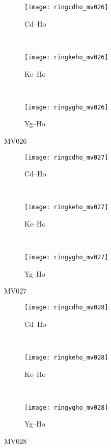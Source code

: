	\begin{figure}[h]
		\centering
		\begin{subfigure}[t]{0.9\textwidth}
			\centering
			\texttt{[image: ringcdho\_mv026]}
			\caption[Cd-Ho MV026]{Cd--Ho}
		\end{subfigure}
		~
		\begin{subfigure}[t]{0.9\textwidth}
			\centering
			\texttt{[image: ringkeho\_mv026]}
			\caption[Ke-Ho MV026]{Ke--Ho}
		\end{subfigure}
		~			
		\begin{subfigure}[t]{0.9\textwidth}
			\centering
			\texttt{[image: ringygho\_mv026]}
			\caption[Yg-Ho MV026]{Yg--Ho}
		\end{subfigure}
		\caption[]{MV026}
	\end{figure}

	\begin{figure}[h]
		\centering
		\begin{subfigure}[t]{0.9\textwidth}
			\centering
			\texttt{[image: ringcdho\_mv027]}
			\caption[Cd-Ho MV027]{Cd--Ho}
		\end{subfigure}
		~
		\begin{subfigure}[t]{0.9\textwidth}
			\centering
			\texttt{[image: ringkeho\_mv027]}
			\caption[Ke-Ho MV027]{Ke--Ho}
		\end{subfigure}
		~			
		\begin{subfigure}[t]{0.9\textwidth}
			\centering
			\texttt{[image: ringygho\_mv027]}
			\caption[Yg-Ho MV027]{Yg--Ho}
		\end{subfigure}
		\caption[]{MV027}
	\end{figure}

	\begin{figure}[h]
		\centering
		\begin{subfigure}[t]{0.9\textwidth}
			\centering
			\texttt{[image: ringcdho\_mv028]}
			\caption[Cd-Ho MV028]{Cd--Ho}
		\end{subfigure}
		~
		\begin{subfigure}[t]{0.9\textwidth}
			\centering
			\texttt{[image: ringkeho\_mv028]}
			\caption[Ke-Ho MV028]{Ke--Ho}
		\end{subfigure}
		~			
		\begin{subfigure}[t]{0.9\textwidth}
			\centering
			\texttt{[image: ringygho\_mv028]}
			\caption[Yg-Ho MV028]{Yg--Ho}
		\end{subfigure}
		\caption[]{MV028}
	\end{figure}

